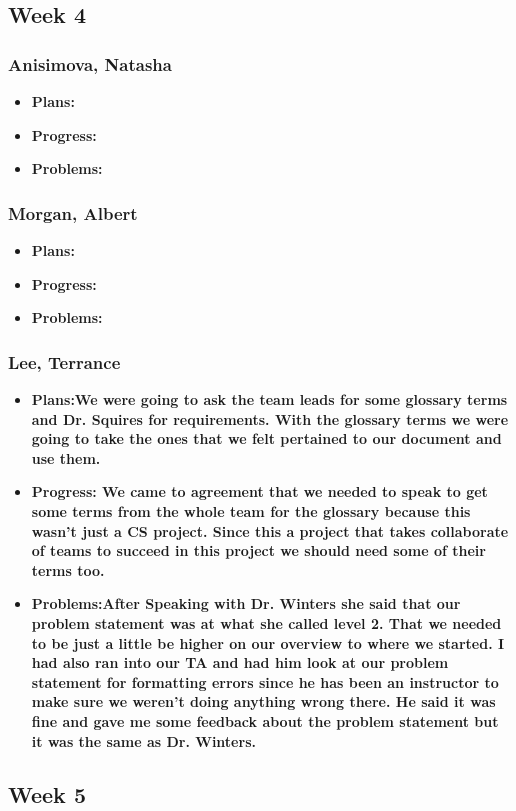 \documentclass[10pt,draftclsnofoot,onecolumn]{IEEEtran}
\begin{document}
\subsection{Week 4}
\subsubsection{Anisimova, Natasha}
\begin{itemize}
	\item \textbf{Plans:}
	\item \textbf{Progress:}
	\item \textbf{Problems:}
\end{itemize}
\subsubsection{Morgan, Albert}
\begin{itemize}
	\item \textbf{Plans:}
	\item \textbf{Progress:}
	\item \textbf{Problems:}
\end{itemize}
\subsubsection{Lee, Terrance}
\begin{itemize}
	\item \textbf{Plans:We were going to ask the team leads for some glossary terms and Dr. Squires for requirements. With the glossary terms we were going to take the ones that we felt pertained to our document and use them.}
	\item \textbf{Progress: We came to agreement that we needed to speak to get some terms from the whole team for the glossary because this wasn't just a CS project. Since this a project that takes collaborate of teams to succeed in this project we should need some of their terms too.}
	\item \textbf{Problems:After Speaking with Dr. Winters she said that our problem statement was at what she called level 2. That we needed to be just a little be higher on our overview to where we started. I had also ran into our TA and had him look at our problem statement for formatting errors since he has been an instructor to make sure we weren't doing anything wrong there. He said it was fine and gave me some feedback about the problem statement but it was the same as Dr. Winters.}
\end{itemize}
\subsection{Week 5}
\end{document}
